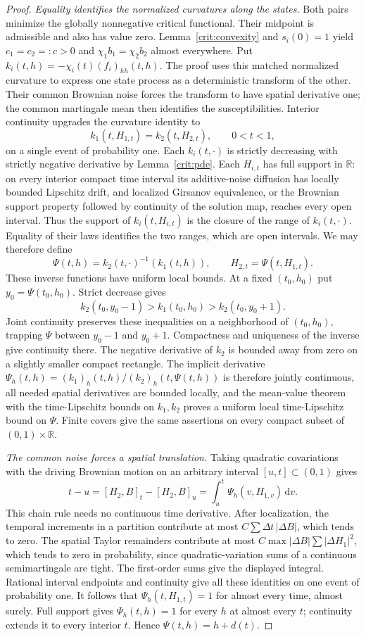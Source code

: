 \documentclass[11pt,a4paper]{article}
\numberwithin{equation}{section}
\theoremstyle{definition}
\theoremstyle{remark}
\newcommand{\R}{\mathbb R}
\newcommand{\dd}{\mathrm d}
\begin{document}
\begin{proof}
\emph{Equality identifies the normalized curvatures along the states.}
Both pairs minimize the globally nonnegative critical functional.
Their midpoint is admissible and also has value zero.
Lemma~\ref{crit:convexity} and $s_i(0)=1$ yield $c_1=c_2=:c>0$ and
$\chi_1b_1=\chi_2b_2$ almost everywhere.  Put
$k_i(t,h)=-\chi_i(t)(f_i)_{hh}(t,h)$.  The proof uses this matched
normalized curvature to express one state process as a deterministic
transform of the other.  Their common Brownian noise forces the transform
to have spatial derivative one; the common martingale mean then identifies
the susceptibilities.  Interior continuity upgrades the curvature
identity to
\[
 k_1(t,H_{1,t})=k_2(t,H_{2,t}),\qquad 0<t<1,
\]
on a single event of probability one.  Each $k_i(t,\cdot)$ is strictly
decreasing with strictly negative derivative by Lemma~\ref{crit:pde}.
Each $H_{i,t}$ has full support in $\R$: on every interior compact
time interval its additive-noise diffusion has locally bounded
Lipschitz drift, and localized Girsanov equivalence, or the Brownian
support property followed by continuity of the solution map, reaches
every open interval.  Thus the support of $k_i(t,H_{i,t})$ is the closure
of the range of $k_i(t,\cdot)$.  Equality of their laws identifies the
two ranges, which are open intervals.  We may therefore define
\[
 \Psi(t,h)=k_2(t,\cdot)^{-1}(k_1(t,h)),\qquad
 H_{2,t}=\Psi(t,H_{1,t}).
\]
These inverse functions have uniform local bounds.  At a fixed
$(t_0,h_0)$ put $y_0=\Psi(t_0,h_0)$.  Strict decrease gives
\[
 k_2(t_0,y_0-1)>k_1(t_0,h_0)>k_2(t_0,y_0+1).
\]
Joint continuity preserves these inequalities on a neighborhood of
$(t_0,h_0)$, trapping $\Psi$ between $y_0-1$ and $y_0+1$.
Compactness and uniqueness of the inverse give continuity there.
The negative derivative of $k_2$ is bounded away from zero on a
slightly smaller compact rectangle.  The implicit derivative
$\Psi_h(t,h)=(k_1)_h(t,h)/(k_2)_h(t,\Psi(t,h))$
is therefore jointly continuous, all needed
spatial derivatives are bounded locally, and the mean-value theorem
with the time-Lipschitz bounds on $k_1,k_2$ proves a uniform local
time-Lipschitz bound on $\Psi$.  Finite covers give the same assertions
on every compact subset of $(0,1)\times\R$.

\emph{The common noise forces a spatial translation.}
Taking quadratic covariations with the driving Brownian motion on
an arbitrary interval $[u,t]\subset(0,1)$ gives
\[
 t-u=[H_2,B]_t-[H_2,B]_u
               =\int_u^t\Psi_h(v,H_{1,v})\,\dd v.
\]
This chain rule needs no continuous time derivative.  After
localization, the temporal increments in a partition contribute at
most $C\sum\Delta t\,|\Delta B|$, which tends to zero.  The spatial
Taylor remainders contribute at most
$C\max|\Delta B|\sum|\Delta H_1|^2$, which tends to zero in
probability, since quadratic-variation sums of a continuous
semimartingale are tight.  The first-order sums give the displayed
integral.  Rational interval endpoints and continuity give all these
identities on one event of probability one.
It follows that $\Psi_h(t,H_{1,t})=1$ for almost every time, almost surely.
Full support gives $\Psi_h(t,h)=1$ for every $h$ at almost every $t$;
continuity extends it to every interior $t$.  Hence
$\Psi(t,h)=h+d(t)$.


\end{proof}
\end{document}
